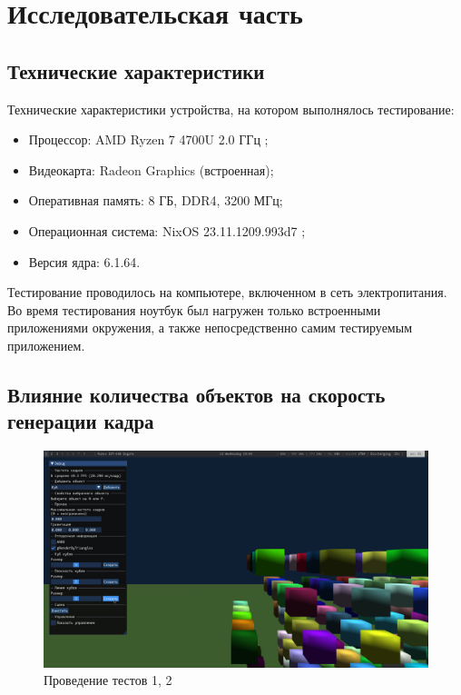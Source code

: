 \section{Исследовательская часть}


\subsection{Технические характеристики}

Технические характеристики устройства, на котором выполнялось тестирование:
\begin{itemize}
    \item Процессор: AMD Ryzen 7 4700U 2.0 ГГц \cite{amd};
    \item Видеокарта: Radeon Graphics (встроенная);
    \item Оперативная память: 8 ГБ, DDR4, 3200 МГц;
    \item Операционная система: NixOS 23.11.1209.993d7 \cite{nixos};
    \item Версия ядра: 6.1.64.
\end{itemize}

Тестирование проводилось на компьютере, включенном в сеть электропитания.
Во время тестирования ноутбук был нагружен только встроенными приложениями окружения, а также непосредственно самим тестируемым приложением.

\subsection{Влияние количества объектов на скорость генерации кадра}

\begin{figure}[H]
	\centering
    \includegraphics[width=\textwidth]{img/cube-static-triangles.png}
	\caption{Проведение тестов 1, 2}
	\label{fig:cst}
\end{figure}

